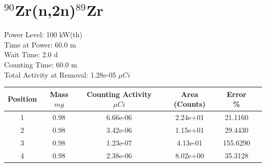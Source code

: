 \newpage

\section*{ $^{90}$Zr(n,2n)$^{89}$Zr }

Power Level: 100 kW(th) \\
Time at Power: 60.0 m \\
Wait Time:  2.0 d \\
Counting Time: 60.0 m \\
Total Activity at Removal: 1.28e-05 $\mu Ci$

\begin{table}[h]
\centering
\begin{tabular}{ |c|c|c|c|c|c| }
 \hline
 Position & Mass $mg$ & Counting Activity $\mu Ci$ & Area (Counts) & Error \% \\
 \hline 
 1 & 0.98 & 6.66e-06 & 2.24e+01 & 21.1160 \\ 
\hline
 2 & 0.98 & 3.42e-06 & 1.15e+01 & 29.4430 \\ 
\hline
 3 & 0.98 & 1.23e-07 & 4.13e-01 & 155.6290 \\ 
\hline
 4 & 0.98 & 2.38e-06 & 8.02e+00 & 35.3128 \\ 
\hline
\end{tabular}
\end{table}

